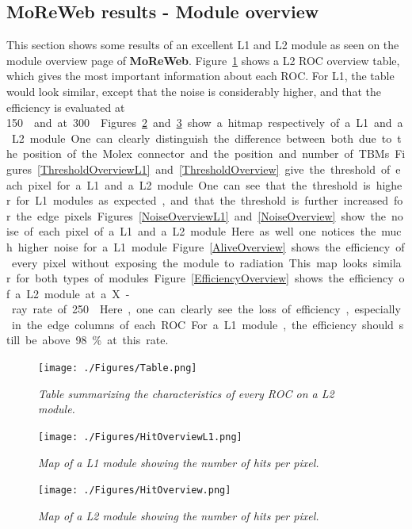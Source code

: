 \documentclass[a4paper,12pt,twoside]{article}
\begin{document}
\begin{appendices}
\section{MoReWeb results - Module overview} \label{ModuleOverview}

This section shows some results of an excellent L1 and L2 module as seen on the module overview page of \textbf{MoReWeb}. Figure~\ref{Table} shows a L2 ROC overview table, which gives the most important information about each ROC. For L1, the table would look similar, except that the noise is considerably higher, and that the efficiency is evaluated at \SI{150}{\mega\hertz\per\centi\meter\square} and at \SI{300}{\mega\hertz\per\centi\meter\square}. Figures~\ref{HitOverviewL1} and \ref{HitOverview} show a hitmap respectively of a L1 and a L2 module. One can clearly distinguish the difference between both due to the position of the Molex connector and the position and number of TBMs. Figures~\ref{ThresholdOverviewL1} and \ref{ThresholdOverview} give the threshold of each pixel for a L1 and a L2 module. One can see that the threshold is higher for L1 modules as expected, and that the threshold is further increased for the edge pixels. Figures~\ref{NoiseOverviewL1} and \ref{NoiseOverview} show the noise of each pixel of a L1 and a L2 module. Here as well one notices the much higher noise for a L1 module. Figure~\ref{AliveOverview} shows the efficiency of every pixel without exposing the module to radiation. This map looks similar for both types of modules. Figure~\ref{EfficiencyOverview} shows the efficiency of a L2 module at a X-ray rate of \SI{250}{\mega\hertz\per\centi\meter\square}. Here, one can clearly see the loss of efficiency, especially in the edge columns of each ROC. For a L1 module, the efficiency should still be above 98\% at this rate. 

\begin{figure} [h!] \centering 
\texttt{[image: ./Figures/Table.png]}
\caption{\em  \label{Table} 
Table summarizing the characteristics of every ROC on a L2 module.}
\end{figure}

\begin{figure} [h!] \centering 
\texttt{[image: ./Figures/HitOverviewL1.png]}
\caption{\em  \label{HitOverviewL1} 
Map of a L1 module showing the number of hits per pixel.}
\end{figure}

\begin{figure} [h!] \centering 
\texttt{[image: ./Figures/HitOverview.png]}
\caption{\em  \label{HitOverview} 
Map of a L2 module showing the number of hits per pixel.}
\end{figure}


\end{appendices}
\end{document}
